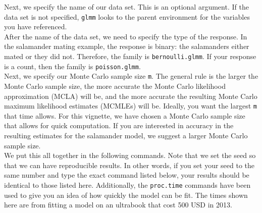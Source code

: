 \documentclass[11pt]{article}\usepackage[]{graphicx}\usepackage[]{color}
\begin{document}
Next,  we specify the name of our data set. This is an optional argument. If the data set is not specified, \texttt{glmm} looks to the parent environment for the variables you have referenced. \\

After the name of the data set, we need to specify the type of the response. In the salamander mating example, the response is binary: the salamanders either mated or they did not. Therefore, the family is \texttt{bernoulli.glmm}. If your response is a count, then the family is \texttt{poisson.glmm}.\\

Next, we specify our Monte Carlo sample size \texttt{m}. The general rule is the larger the Monte Carlo sample size, the more accurate the Monte Carlo likelihood approximation (MCLA) will be, and the more accurate the resulting Monte Carlo maximum likelihood estimates (MCMLEs) will be. Ideally, you want the largest \texttt{m} that time allows. For this vignette, we have chosen a Monte Carlo sample size that allows for quick computation. If you are interested in accuracy in the resulting estimates for the salamander model, we suggest a larger Monte Carlo sample size.  \\


We put this all together in the following commands. Note that we set the seed so that we can have reproducible results. In other words, if you set your seed to the same number and type the exact command listed below, your results should be identical to those listed here. Additionally, the \texttt{proc.time} commands have been used to give you an idea of how quickly the model can be fit. The times shown here are from fitting a model on an ultrabook that cost 500 USD in 2013. 
\end{document}

